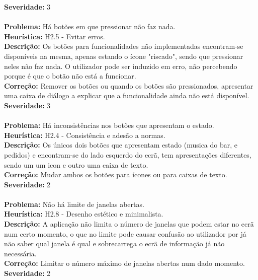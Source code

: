 \documentclass{article}
\begin{document}
\textbf{Severidade:} 3\\
\\
\textbf{Problema:} Há botões em que pressionar não faz nada.\\
\textbf{Heurística:} H2.5 - Evitar erros.\\
\textbf{Descrição:} Os botões para funcionalidades não implementadas encontram-se disponíveis na mesma, apenas estando o ícone "riscado", sendo que pressionar neles não faz nada. O utilizador pode ser induzido em erro, não percebendo porque é que o botão não está a funcionar.\\
\textbf{Correção:} Remover os botões ou quando os botões são pressionados, apresentar uma caixa de diálogo a explicar que a funcionalidade ainda não está disponível.\\
\textbf{Severidade:} 3\\
\\
\textbf{Problema:} Há inconsistências nos botões que apresentam o estado.\\
\textbf{Heurística:} H2.4 - Consistência e adesão a normas.\\
\textbf{Descrição:} Os únicos dois botões que apresentam estado (musica do bar, e pedidos) e encontram-se do lado esquerdo do ecrã, tem apresentações diferentes, sendo um um icon e outro uma caixa de texto.\\
\textbf{Correção:} Mudar ambos os botões para ícones ou para caixas de texto.\\
\textbf{Severidade:} 2\\
\\
\textbf{Problema:} Não há limite de janelas abertas.\\
\textbf{Heurística:} H2.8 - Desenho	estético	 e minimalista.\\
\textbf{Descrição:} A aplicação não limita o número de janelas que podem estar no ecrã num certo momento, o que no limite pode causar confusão ao utilizador por já não saber qual janela é qual e sobrecarrega o ecrã de informação já não necessária.\\
\textbf{Correção:} Limitar o número máximo de janelas abertas num dado momento.\\
\textbf{Severidade:} 2\\
\\
\end{document}
